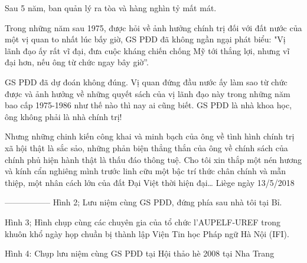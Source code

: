 Sau 5 năm, ban quản lý ra tòa và hàng nghìn tỷ mất mát.

Trong những năm sau 1975, được hỏi về ảnh hưởng chính trị đối với đất nước của một vị quan to nhất lúc bấy giờ, GS PĐD đã không ngần ngại phát biểu:
 "Vị lãnh đạo ấy rất vĩ đại, đưa cuộc kháng chiến chống Mỹ tới thắng lợi, nhưng vĩ đại hơn, nếu ông từ chức ngay bây giờ”.
 
GS PĐD đã dự đoán không đúng. Vị quan đứng đầu nước ấy làm sao từ chức được và ảnh hưởng về những quyết sách của vị lãnh đạo này trong những năm bao cấp 1975-1986 như thế nào thì nay ai cũng biết.
GS PĐD là nhà khoa học, ông không phải là nhà chính trị!

Nhưng những chinh kiến công khai và minh bạch của ông về tình hình chính trị xã hội thật là sắc sảo, những phản biện thẳng thắn của ông về chính sách của chính phủ hiện hành thật là thấu đáo thông tuệ.
Cho tôi xin thắp một nén hương và kính cẩn nghiêng mình trước linh cữu một bậc trí thức chân chính và mẫn thiệp, một nhân cách lớn của đất Đại Việt thời hiện đại…
Liège ngày 13/5/2018

-----------------
Hình 2; Lưu niệm cùng GS PĐD, đứng phía sau nhà tôi tại Bỉ.

Hình 3; Hình chụp cùng các chuyên gia của tổ chức l’AUPELF-UREF trong khuôn khổ ngày họp chuần bị thành lập Viện Tin học Pháp ngữ Hà Nội (IFI).

Hình 4: Chụp lưu niệm cùng GS PĐD tại Hội thảo hè 2008 tại Nha Trang